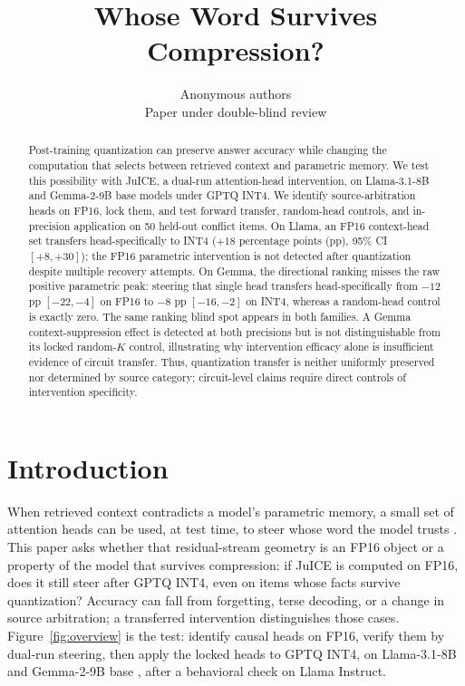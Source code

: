 \documentclass{article} %
\title{Whose Word Survives Compression?}
\author{Anonymous authors \\ Paper under double-blind review}
\begin{document}
\maketitle

\begin{abstract}
Post-training quantization can preserve answer accuracy while changing the computation that selects between retrieved context and parametric memory. We test this possibility with JuICE, a dual-run attention-head intervention, on Llama-3.1-8B and Gemma-2-9B base models under GPTQ INT4. We identify source-arbitration heads on FP16, lock them, and test forward transfer, random-head controls, and in-precision application on 50 held-out conflict items. On Llama, an FP16 context-head set transfers head-specifically to INT4 ($+18$ percentage points (pp), 95\% CI $[+8,+30]$); the FP16 parametric intervention is not detected after quantization despite multiple recovery attempts. On Gemma, the directional ranking misses the raw positive parametric peak: steering that single head transfers head-specifically from $-12$ pp $[-22,-4]$ on FP16 to $-8$ pp $[-16,-2]$ on INT4, whereas a random-head control is exactly zero. The same ranking blind spot appears in both families. A Gemma context-suppression effect is detected at both precisions but is not distinguishable from its locked random-$K$ control, illustrating why intervention efficacy alone is insufficient evidence of circuit transfer. Thus, quantization transfer is neither uniformly preserved nor determined by source category; circuit-level claims require direct controls of intervention specificity.
\end{abstract}

\section{Introduction}
\label{sec:intro}

When retrieved context contradicts a model's parametric memory, a small set of attention heads can be used, at test time, to steer whose word the model trusts \citep{li2025taming}. This paper asks whether that residual-stream geometry is an FP16 object or a property of the model that survives compression: if JuICE is computed on FP16, does it still steer after GPTQ INT4, even on items whose facts survive quantization? Accuracy can fall from forgetting, terse decoding, or a change in source arbitration; a transferred intervention distinguishes those cases. Figure~\ref{fig:overview} is the test: identify causal heads on FP16, verify them by dual-run steering, then apply the locked heads to GPTQ INT4, on Llama-3.1-8B and Gemma-2-9B base \citep{grattafiori2024llama,team2024gemma2}, after a behavioral check on Llama Instruct.
\end{document}
